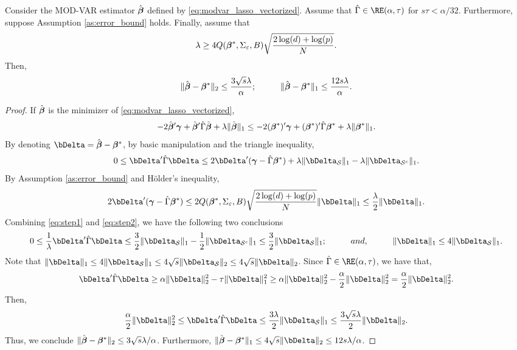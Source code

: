 \begin{prop}
    Consider the MOD-VAR estimator $\hat{\bm{\beta}}$ defined by \eqref{eq:modvar_lasso_vectorized}. Assume that $\hat\Gamma \in\RE(\alpha,\tau)$ for $s\tau < \alpha/32$. Furthermore, suppose Assumption \ref{as:error_bound} holds. Finally, assume that $$ \lambda \geq 4Q(\bm{\beta}^*, \Sigma_\varepsilon, B) \sqrt{\frac{2\log(d) + \log(p)}{N}}.$$
    Then,
    \begin{align*}
        \|\hat\bbeta - \bbeta^* \|_2  \leq \frac{3\sqrt{s}\lambda}{\alpha} ; \hspace{10mm} \| \hat\bbeta - \bbeta^*\|_1 \leq \frac{12s \lambda}{\alpha}.
    \end{align*}
\end{prop}
\begin{proof}
    If $\hat{\bm{\beta}}$ is the minimizer of \eqref{eq:modvar_lasso_vectorized}, 
    $$  -2\hat{\bm{\beta}}' \bm{\gamma} + \hat{\bm{\beta}}'\hat\Gamma\hat{\bm{\beta}} + \lambda\|\hat{\bm{\beta}}\|_1  \leq  -2(\bm{\beta}^*)' \bm{\gamma} + (\bm{\beta}^*)'\hat\Gamma\bm{\beta}^* + \lambda\|\bm{\beta}^*\|_1. $$ 
    By denoting $\bDelta = \hat\bbeta - \bbeta^*$, by basic manipulation and the triangle inequality,
    \begin{equation}\label{eq:step1}
        0\leq \bDelta' \hat\Gamma \bDelta  \leq 2\bDelta' ( \bgamma - \hat\Gamma \bbeta^* ) + \lambda\|\bDelta_{\cS}\|_1 - \lambda\| \bDelta_{\cS^c}\|_1.    
    \end{equation}
    By Assumption \ref{as:error_bound} and Hölder's inequality,
    \begin{equation}\label{eq:step2}
        2\bDelta' ( \bgamma - \hat\Gamma \bbeta^* ) \leq 2Q(\bbeta^*, \Sigma_\varepsilon, B) \sqrt{\frac{2\log(d) + \log(p)}{N}} \|\bDelta\|_1 \leq \frac{\lambda}{2} \|\bDelta\|_1.
    \end{equation}
    Combining \eqref{eq:step1} and \eqref{eq:step2}, we have the following two conclusions
    \begin{equation*}
        0\leq \frac{1}{\lambda}\bDelta' \hat\Gamma \bDelta  \leq \frac{3}{2}\|\bDelta_{\cS}\|_1 - \frac{1}{2}\|\bDelta_{\cS^c}\|_1 \leq  \frac{3}{2}\|\bDelta_{\cS}\|_1; \hspace{10mm} and,\hspace{10mm} \|\bDelta\|_1 \leq 4\|\bDelta_{\cS}\|_1.
    \end{equation*}
    Note that $\|\bDelta\|_1 \leq 4\|\bDelta_\cS\|_1 \leq 4\sqrt{s} \|\bDelta_\cS\|_2 \leq 4\sqrt{s} \|\bDelta\|_2$. Since $\hat\Gamma\in\RE(\alpha, \tau)$, we have that,
    \begin{align*}
        \bDelta'\hat\Gamma \bDelta\geq \alpha \|\bDelta\|_2^2 - \tau \|\bDelta\|_1^2 \geq \alpha \|\bDelta\|_2^2 - \frac{\alpha}{2}\|\bDelta\|_2^2 = \frac{\alpha}{2}\|\bDelta\|_2^2.
    \end{align*}
    Then, $$\frac{\alpha}{2} \|\bDelta\|_2^2 \leq \bDelta' \hat\Gamma \bDelta \leq \frac{3\lambda}{2}\|\bDelta_{\cS}\|_1 \leq \frac{3\sqrt{s}\lambda}{2} \|\bDelta\|_2.$$ 
    Thus, we conclude $\|\hat{\bm{\beta}} - \bm{\beta}^*\|_2 \leq 3\sqrt{s}\lambda / \alpha$. Furthermore, $\|\hat\bbeta - \bbeta^*\|_1 \leq 4\sqrt{s}\|\bDelta\|_2 \leq 12s \lambda/\alpha$.
\end{proof} 



